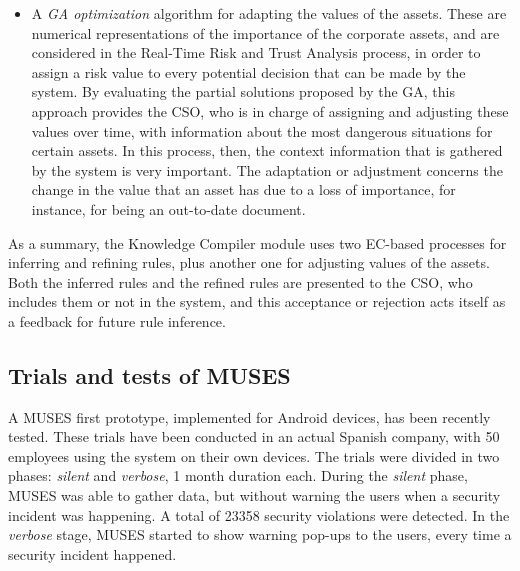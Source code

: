 \begin{itemize}
\item A \textit{GA optimization} algorithm for adapting the values of the assets. %
These are numerical representations of the importance of the corporate assets, and are considered in the Real-Time Risk and Trust Analysis process, in order to assign a risk value to every potential decision that can be made by the system.
By evaluating the partial solutions proposed by the GA, this approach provides the CSO, who is in charge of assigning and adjusting these values over time, with information about the most dangerous situations for certain assets. In this process, then, the context information that is gathered by the system is very important. %
The adaptation or adjustment concerns the change in the value that an asset has due to a loss of importance, for instance, for being an out-to-date document.

\end{itemize}


As a summary, the Knowledge Compiler module uses two EC-based processes for inferring and refining rules, plus another one for adjusting values of the assets.
 Both the inferred rules and the refined rules are presented to the CSO, who includes them or not in the system, and this acceptance or rejection acts itself as a feedback for future rule inference.



\subsection{Trials and tests of MUSES}
\label{subsec:trials}

A MUSES first prototype, implemented for Android devices, has been recently tested. These trials have been conducted in an actual Spanish company, with 50 employees using the system on their own devices.
The trials were divided in two phases: \textit{silent} and \textit{verbose}, 1 month duration each. During the \textit{silent} phase, MUSES was able to gather data, but without warning the users when a security incident was happening. A total of 23358 security violations were detected. In the \textit{verbose} stage, MUSES started to show warning pop-ups to the users, every time a security incident happened. 


